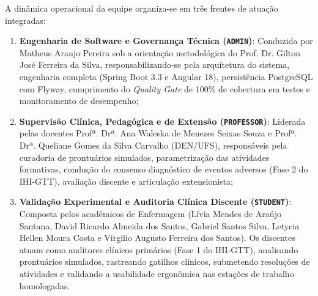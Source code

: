 A dinâmica operacional da equipe organiza-se em três frentes de atuação integradas:
\begin{enumerate}
    \item \textbf{Engenharia de Software e Governança Técnica (\texttt{ADMIN})}: Conduzida por Matheus Araujo Pereira sob a orientação metodológica do Prof. Dr. Gilton José Ferreira da Silva, responsabilizando-se pela arquitetura do sistema, engenharia completa (Spring Boot 3.3 e Angular 18), persistência PostgreSQL com Flyway, cumprimento do \textit{Quality Gate} de 100\% de cobertura em testes e monitoramento de desempenho;
    \item \textbf{Supervisão Clínica, Pedagógica e de Extensão (\texttt{PROFESSOR})}: Liderada pelas docentes Profª. Drª. Ana Waleska de Menezes Seixas Souza e Profª. Drª. Queliane Gomes da Silva Carvalho (DEN/UFS), responsáveis pela curadoria de prontuários simulados, parametrização das atividades formativas, condução do consenso diagnóstico de eventos adversos (Fase 2 do IHI-GTT), avaliação discente e articulação extensionista;
    \item \textbf{Validação Experimental e Auditoria Clínica Discente (\texttt{STUDENT})}: Composta pelos acadêmicos de Enfermagem (Lívia Mendes de Araújo Santana, David Ricardo Almeida dos Santos, Gabriel Santos Silva, Letycia Hellen Moura Costa e Virgilio Augusto Ferreira dos Santos). Os discentes atuam como auditores clínicos primários (Fase 1 do IHI-GTT), analisando prontuários simulados, rastreando gatilhos clínicos, submetendo resoluções de atividades e validando a usabilidade ergonômica nas estações de trabalho homologadas.
\end{enumerate}
